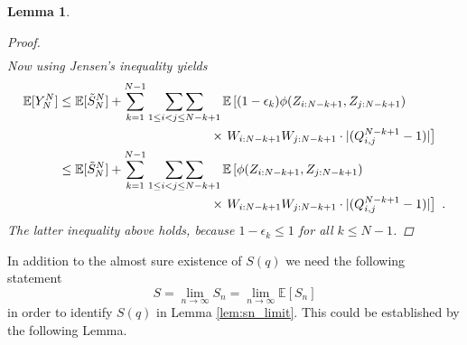 \documentclass[phd]{UWMThesis}
\DeclarePairedDelimiter\abs{\lvert}{\rvert}%
\newcommand{\E}{\mathbb{E}}
\newcommand{\StN}[1]{\tilde{S}_{#1}^N}
\newcommand{\mdot}{\textrm{ .}}
\renewcommand{\.}{\textrm{ .}}
\newcommand{\doublesum}{\mathop{\sum\sum}}
\newtheorem{lemma}[thm]{Lemma}
\theoremstyle{definition}
\numberwithin{thm}{chapter}
\begin{document}
\begin{lemma}
\begin{proof}
\begin{align*}
		\end{align*}
		Now using Jensen's inequality yields
		\begin{align*}
		\E[Y_N^N] &\leq \E[\StN{N}] + \sum_{k=1}^{N-1} \doublesum\limits_{1\leq i<j\leq N-k+1}\E\left[(1-\epsilon_k) \phi(Z_{i:N-k+1}, Z_{j:N-k+1}) \right.\\
		&\qquad\qquad\qquad\qquad\qquad\qquad \times \left. W_{i:N-k+1} W_{j:N-k+1} \cdot \abs{(Q_{i,j}^{N-k+1} - 1)}\right]\\
		&\leq \E[\StN{N}] + \sum_{k=1}^{N-1} \doublesum\limits_{1\leq i<j\leq N-k+1}\E\left[\phi(Z_{i:N-k+1}, Z_{j:N-k+1}) \right. \\
		&\qquad\qquad\qquad\qquad\qquad\qquad \times \left. W_{i:N-k+1} W_{j:N-k+1} \cdot \abs{(Q_{i,j}^{N-k+1} - 1)}\right]\mdot
		\end{align*}
		The latter inequality above holds, because $1-\epsilon_k \leq 1$ for all $k\leq N-1$. 
	\end{proof}
\end{lemma}
%
In addition to the almost sure existence of $S(q)$ we need the following statement 
$$S = \lim\limits_{n\to\infty} S_n = \lim\limits_{n\to\infty}\E[S_n]$$
in order to identify $S(q)$ in Lemma \ref{lem:sn_limit}. This could be established by the following Lemma.
\end{document}
